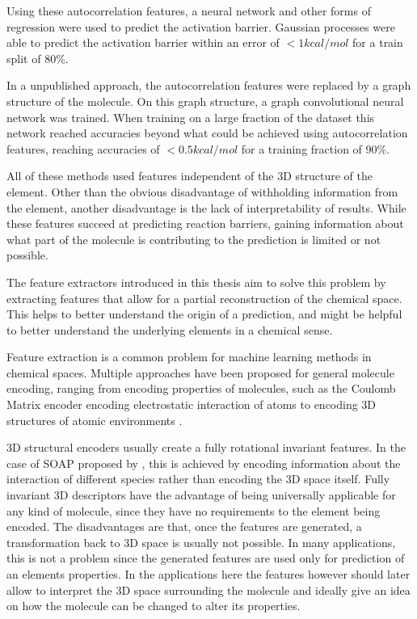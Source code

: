 Using these autocorrelation features, a neural network and other forms of regression were used to predict the activation barrier.
Gaussian processes were able to predict the activation barrier within an error of $<1 kcal/mol$ for a train split of $80\%$.

In a unpublished approach, the autocorrelation features were replaced by a graph structure of the molecule.
On this graph structure, a graph convolutional neural network was trained.
When training on a large fraction of the dataset this network reached accuracies 
beyond what could be achieved using autocorrelation features, reaching accuracies of $<0.5 kcal/mol$ for a training fraction of 90\%.

All of these methods used features independent of the 3D structure of the element.
Other than the obvious disadvantage of withholding information from the element, another disadvantage is the lack of interpretability of results.
While these features succeed at predicting reaction barriers, gaining 
information about what part of the molecule is contributing to the prediction is limited or not possible.

The feature extractors introduced in this thesis aim to solve this problem by extracting features that allow for a
partial reconstruction of the chemical space.
This helps to better understand the origin of a prediction, and might be helpful to better understand 
the underlying elements in a chemical sense.

Feature extraction is a common problem for machine learning methods in chemical spaces.
Multiple approaches have been proposed for general molecule encoding, 
ranging from encoding properties of molecules, such as the Coulomb Matrix encoder encoding electrostatic interaction of atoms \cite{PhysRevLett.108.058301}
to encoding 3D structures of atomic environments \cite{Bart_k_2013}.

3D structural encoders usually create a fully rotational invariant features.
In the case of SOAP proposed by \citeauthor{Bart_k_2013}, this is achieved by encoding information about the interaction of 
different species rather than encoding the 3D space itself.
Fully invariant 3D descriptors have the advantage of being universally applicable for any kind of molecule, since they have no requirements to the element being encoded.
The disadvantages are that, once the features are generated, a transformation back to 3D space is usually not possible.
In many applications, this is not a problem since the generated features are used only for prediction of an elements properties.
In the applications here the features however should later allow to interpret the 3D space surrounding the molecule and ideally give an idea on how the molecule can be changed to alter its properties.

